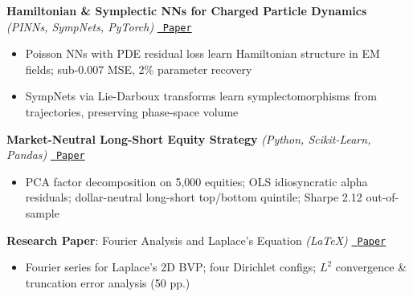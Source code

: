 \documentclass[10.5pt]{article}
\begin{document}
\textbf{Hamiltonian \& Symplectic NNs for Charged Particle Dynamics} \textit{(PINNs, SympNets, PyTorch)} \hfill \href{https://eugenio-macias.github.io/assets/files/electron_dynamics_DL.pdf}{\faFilePdf\ \texttt{Paper}} \vspace{-7pt}
\begin{itemize}
  \item Poisson NNs with PDE residual loss learn Hamiltonian structure in EM fields; sub-0.007 MSE, 2\% parameter recovery
  \item SympNets via Lie-Darboux transforms learn symplectomorphisms from trajectories, preserving phase-space volume
\end{itemize}
\textbf{Market-Neutral Long-Short Equity Strategy} \textit{(Python, Scikit-Learn, Pandas)} \hfill \href{https://eugenio-macias.github.io/ECON_1750_PCA\%20(1).pdf}{\faFilePdf\ \texttt{Paper}} \vspace{-7pt}
\begin{itemize}
  \item PCA factor decomposition on 5{,}000 equities; OLS idiosyncratic alpha residuals; dollar-neutral long-short top/bottom quintile; Sharpe 2.12 out-of-sample
\end{itemize}
\textbf{Research Paper}: Fourier Analysis and Laplace's Equation \textit{(LaTeX)} \hfill \href{https://eugenio-macias.github.io/assets/files/Extended_Essay.pdf}{\faFilePdf\ \texttt{Paper}} \vspace{-7pt}
\begin{itemize}
  \item Fourier series for Laplace's 2D BVP; four Dirichlet configs; $L^2$ convergence \& truncation error analysis (50 pp.)
\end{itemize}
\vspace{1pt}
\end{document}
